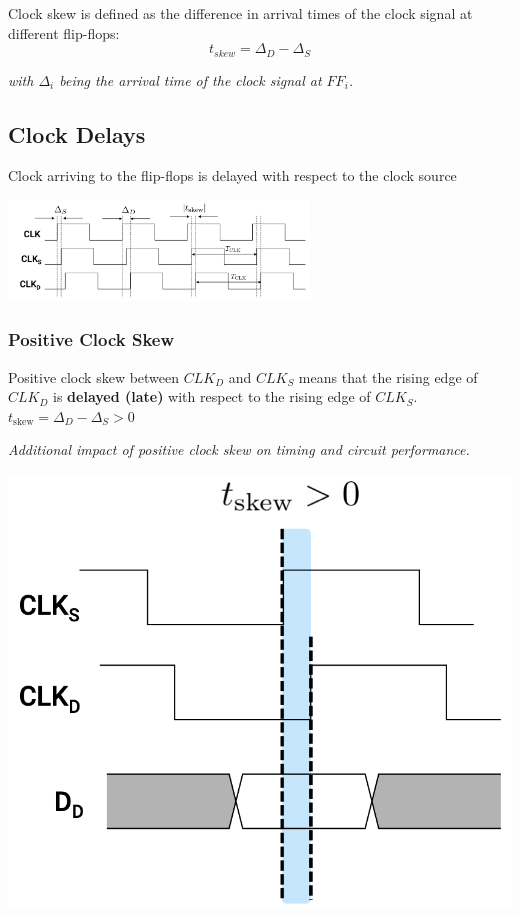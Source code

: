 \documentclass[12pt,openany]{book}
\begin{document}
\begin{justify}
	Clock skew is defined as the difference in arrival times of the clock signal at different flip-flops:
	$$t_{skew} = \Delta_D - \Delta_S$$
\end{justify}
\textit{with $\Delta_i$ being the arrival time of the clock signal at $FF_i$.}

\subsection{Clock Delays}
Clock arriving to the flip-flops is delayed with respect to the clock source
\begin{center}
	\includegraphics[width=0.6\textwidth]{circuits/15.5.1.png}
\end{center}
\subsubsection{Positive Clock Skew}
\begin{minipage}{0.5\textwidth}


\begin{justify}
	Positive clock skew between $CLK_D$ and $CLK_S$ means that the rising edge of $CLK_D$ is \textbf{delayed (late)} with respect to the rising edge of $CLK_S$. 
	$t_{\text{skew}} = \Delta_D - \Delta_S > 0$
\end{justify}
\vspace*{5px}
\textit{Additional impact of positive clock skew on timing and circuit performance.}
\end{minipage} \hfill
\vline
\hfill
\begin{minipage}{0.4\textwidth}
    \includegraphics[width=\textwidth]{circuits/15.5.1_2.png}
\end{minipage}
\end{document}
